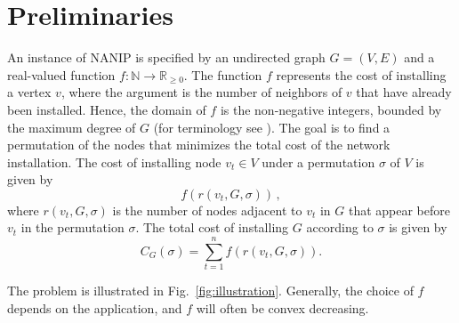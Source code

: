 \section{Preliminaries}
An instance of NANIP is specified by an undirected graph $G=(V,E)$ and a
real-valued function $f: \mathbb{N} \to \mathbb{R}_{\geq 0}$. The function $f$
represents the cost of installing a vertex $v$, where the argument is the
number of neighbors of $v$ that have already been installed. Hence, the domain
of $f$ is the non-negative integers, bounded by the maximum degree of $G$ (for
terminology see \cite{West01}).  The goal is to find a permutation of the nodes
that minimizes the total cost of the network installation. The cost of
installing node $v_t \in V$ under a permutation $\sigma$ of $V$ is given by
$$f(r(v_t, G, \sigma))\,,$$ where $r(v_t, G, \sigma)$ is the number of nodes
adjacent to $v_t$ in $G$ that appear before $v_t$ in the permutation $\sigma$.
The total cost of installing $G$ according to $\sigma$ is given by
\begin{equation} C_G(\sigma) = \sum_{t=1}^{n} f(r(v_t, G, \sigma)).
\label{eq:general-NANIP} \end{equation}

The problem is illustrated in Fig.~\ref{fig:illustration}.  Generally, the
choice of $f$ depends on the application, and $f$ will often be convex
decreasing. 

